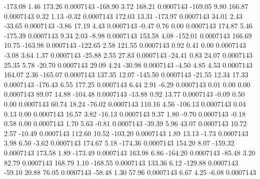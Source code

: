      -173.08        1.46      173.26     0.0007143
     -168.90        3.72      168.21     0.0007143
     -169.05        9.80      166.87     0.0007143
        0.32        1.13       -0.32     0.0007143
      172.03       13.31     -173.97     0.0007143
       34.01        2.43      -33.65     0.0007143
       -3.86       17.19        4.43     0.0007143
       -0.47        0.76        0.00     0.0007143
      174.87        5.46     -175.39     0.0007143
        9.34        2.03       -8.98     0.0007143
      153.58        4.08     -152.01     0.0007143
      166.69       10.75     -163.98     0.0007143
     -122.65        2.58      121.55     0.0007143
        0.92        0.41        0.00     0.0007143
       -3.08        3.64        1.37     0.0007143
      -25.88        2.55       27.83     0.0007143
      -24.41        0.83       24.07     0.0007143
       25.35        5.78      -20.70     0.0007143
       29.09        4.24      -30.98     0.0007143
       -4.50        4.85        4.53     0.0007143
      164.07        2.36     -165.07     0.0007143
      137.35       12.07     -145.50     0.0007143
      -21.55       12.34       17.33     0.0007143
     -176.43        6.55      177.25     0.0007143
        6.44        2.91       -6.29     0.0007143
        0.01        0.00        0.00     0.0007143
       89.07       14.88     -104.48     0.0007143
      -13.88        0.92       13.77     0.0007143
       -0.09        0.50        0.00     0.0007143
       60.74       18.24      -76.02     0.0007143
      110.16        4.56     -106.13     0.0007143
        0.04        0.13        0.00     0.0007143
       16.57        3.82      -16.13     0.0007143
        9.37        1.80       -9.70     0.0007143
       -0.18        0.58        0.00     0.0007143
        1.70        5.63       -0.81     0.0007143
      -39.39        5.96       43.07     0.0007143
       10.72        2.57      -10.49     0.0007143
      112.60       10.52     -103.20     0.0007143
        1.89       13.13       -1.73     0.0007143
        3.98        6.50       -3.62     0.0007143
      174.67        5.18     -174.36     0.0007143
      154.20        8.07     -159.32     0.0007143
      173.58        1.89     -173.49     0.0007143
      163.98        6.86     -164.20     0.0007143
      -85.48        3.20       82.79     0.0007143
      168.79        1.10     -168.55     0.0007143
      133.36        6.12     -129.88     0.0007143
      -59.10       20.88       76.05     0.0007143
      -58.48        1.30       57.96     0.0007143
        6.67        4.25       -6.08     0.0007143
